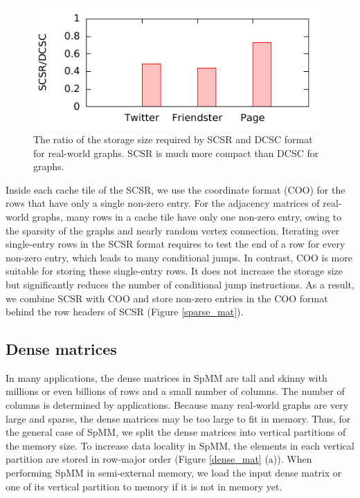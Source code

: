 \begin{figure}
	\begin{center}
		\footnotesize
		\includegraphics[scale=1]{SpMM_figs/storage.pdf}
		\caption{The ratio of the storage size required by SCSR and DCSC
			\cite{Buluc08} format for real-world graphs. SCSR is much more
		compact than DCSC for graphs.}
		\label{fig:storage}
	\end{center}
\end{figure}

Inside each cache tile of the SCSR, we use the coordinate format (COO) for
the rows that have only a single non-zero entry. For the adjacency matrices of
real-world graphs, many rows in a cache tile have only one non-zero entry,
owing to the sparsity of the graphs and nearly random vertex connection.
Iterating over single-entry rows in the SCSR format requires to test
the end of a row for every non-zero entry, which leads to many conditional jumps.
In contrast, COO is more suitable for storing these
single-entry rows. It does not increase the storage size but significantly
reduces the number of conditional jump instructions. As a result, we combine
SCSR with COO and store non-zero entries in the COO format behind the row headers
of SCSR (Figure \ref{sparse_mat}).


\subsection{Dense matrices}
In many applications, the dense matrices in SpMM are tall and skinny with
millions or even billions of rows and a small number of columns.
The number of columns is determined by applications. Because many real-world graphs
are very large and sparse, the dense matrices may be too large to fit in memory.
Thus, for the general case of SpMM, we split the dense matrices into vertical
partitions of the memory size. To increase data locality in SpMM, the elements
in each vertical partition are stored in row-major order (Figure \ref{dense_mat}
(a)). When performing SpMM in semi-external memory, we load the input dense
matrix or one of its vertical partition to memory if it is not in memory yet.


